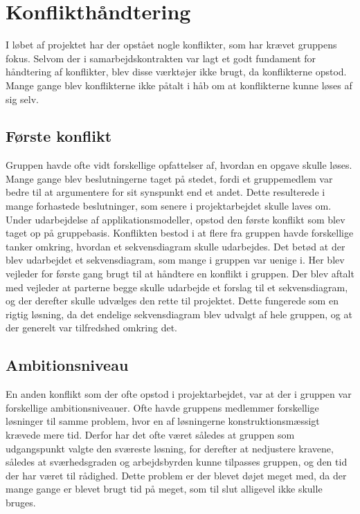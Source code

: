 \section{Konflikthåndtering}

I løbet af projektet har der opstået nogle konflikter, som har krævet gruppens fokus. Selvom der i samarbejdskontrakten var lagt et godt fundament for håndtering af konflikter, blev disse værktøjer ikke brugt, da konflikterne opstod. Mange gange blev konflikterne ikke påtalt i håb om at konflikterne kunne løses af sig selv. 

\subsection*{Første konflikt}
Gruppen havde ofte vidt forskellige opfattelser af, hvordan en opgave skulle løses. Mange gange blev beslutningerne taget på stedet, fordi et gruppemedlem var bedre til at argumentere for sit synspunkt end et andet. Dette resulterede i mange forhastede beslutninger, som senere i projektarbejdet skulle laves om. Under udarbejdelse af applikationsmodeller, opstod den første konflikt som blev taget op på gruppebasis. Konflikten bestod i at flere fra gruppen havde forskellige tanker omkring, hvordan et sekvensdiagram skulle udarbejdes. Det betød at der blev udarbejdet et sekvensdiagram, som mange i gruppen var uenige i. Her blev vejleder for første gang brugt til at håndtere en konflikt i gruppen. Der blev aftalt med vejleder at parterne begge skulle udarbejde et forslag til et sekvensdiagram, og der derefter skulle udvælges den rette til projektet. Dette fungerede som en rigtig løsning, da det endelige sekvensdiagram blev udvalgt af hele gruppen, og at der generelt var tilfredshed omkring det.
\subsection{Ambitionsniveau}
En anden konflikt som der ofte opstod i projektarbejdet, var at der i gruppen var forskellige ambitionsniveauer. Ofte havde gruppens medlemmer forskellige løsninger til samme problem, hvor en af løsningerne konstruktionsmæssigt krævede mere tid. Derfor har det ofte været således at gruppen som udgangspunkt valgte den sværeste løsning, for derefter at nedjustere kravene, således at sværhedsgraden og arbejdsbyrden kunne tilpasses gruppen, og den tid der har været til rådighed. Dette problem er der blevet døjet meget med, da der mange gange er blevet brugt tid på meget, som til slut alligevel ikke skulle bruges. 
